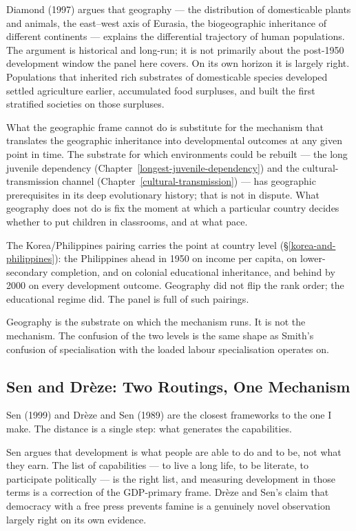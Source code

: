\documentclass[12pt,letterpaper]{article}
\begin{document}
Diamond (1997) argues that geography --- the distribution of domesticable plants and animals, the east--west axis of Eurasia, the biogeographic inheritance of different continents --- explains the differential trajectory of human populations. The argument is historical and long-run; it is not primarily about the post-1950 development window the panel here covers. On its own horizon it is largely right. Populations that inherited rich substrates of domesticable species developed settled agriculture earlier, accumulated food surpluses, and built the first stratified societies on those surpluses.

What the geographic frame cannot do is substitute for the mechanism that translates the geographic inheritance into developmental outcomes at any given point in time. The substrate for which environments could be rebuilt --- the long juvenile dependency (Chapter~\ref{longest-juvenile-dependency}) and the cultural-transmission channel (Chapter~\ref{cultural-transmission}) --- has geographic prerequisites in its deep evolutionary history; that is not in dispute. What geography does not do is fix the moment at which a particular country decides whether to put children in classrooms, and at what pace.

The Korea/Philippines pairing carries the point at country level (§\ref{korea-and-philippines}): the Philippines ahead in 1950 on income per capita, on lower-secondary completion, and on colonial educational inheritance, and behind by 2000 on every development outcome. Geography did not flip the rank order; the educational regime did. The panel is full of such pairings.

Geography is the substrate on which the mechanism runs. It is not the mechanism. The confusion of the two levels is the same shape as Smith's confusion of specialisation with the loaded labour specialisation operates on.

\subsection{Sen and Drèze: Two Routings, One Mechanism}\label{sen-and-dreze-two-routings}

Sen (1999) and Drèze and Sen (1989) are the closest frameworks to the one I make. The distance is a single step: what generates the capabilities.

Sen argues that development is what people are able to do and to be, not what they earn. The list of capabilities --- to live a long life, to be literate, to participate politically --- is the right list, and measuring development in those terms is a correction of the GDP-primary frame. Drèze and Sen's claim that democracy with a free press prevents famine is a genuinely novel observation largely right on its own evidence.
\end{document}

